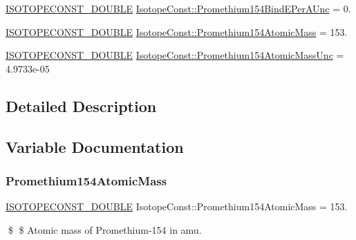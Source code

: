 \begin{DoxyCompactItemize}
\item 
\mbox{\hyperlink{group___isotope_const-_macros_ga8f45a7272ce02c0b4c65c44636ed719a}{I\+S\+O\+T\+O\+P\+E\+C\+O\+N\+S\+T\+\_\+\+D\+O\+U\+B\+LE}} \mbox{\hyperlink{group___isotope_const-_promethium-_pm154_ga8212d49362dad33b635c26261a298b07}{Isotope\+Const\+::\+Promethium154\+Bind\+E\+Per\+A\+Unc}} = 0.
\item 
\mbox{\hyperlink{group___isotope_const-_macros_ga8f45a7272ce02c0b4c65c44636ed719a}{I\+S\+O\+T\+O\+P\+E\+C\+O\+N\+S\+T\+\_\+\+D\+O\+U\+B\+LE}} \mbox{\hyperlink{group___isotope_const-_promethium-_pm154_ga36d40fe8c6eb67bcb65b55acade9707b}{Isotope\+Const\+::\+Promethium154\+Atomic\+Mass}} = 153.
\item 
\mbox{\hyperlink{group___isotope_const-_macros_ga8f45a7272ce02c0b4c65c44636ed719a}{I\+S\+O\+T\+O\+P\+E\+C\+O\+N\+S\+T\+\_\+\+D\+O\+U\+B\+LE}} \mbox{\hyperlink{group___isotope_const-_promethium-_pm154_ga985ca2131c74cf95a3def8c6c417a5a3}{Isotope\+Const\+::\+Promethium154\+Atomic\+Mass\+Unc}} = 4.\+9733e-\/05
\end{DoxyCompactItemize}


\subsection{Detailed Description}


\subsection{Variable Documentation}
\mbox{\label{group___isotope_const-_promethium-_pm154_ga36d40fe8c6eb67bcb65b55acade9707b}} 
\subsubsection{\texorpdfstring{Promethium154\+Atomic\+Mass}{Promethium154AtomicMass}}
{\footnotesize\ttfamily \mbox{\hyperlink{group___isotope_const-_macros_ga8f45a7272ce02c0b4c65c44636ed719a}{I\+S\+O\+T\+O\+P\+E\+C\+O\+N\+S\+T\+\_\+\+D\+O\+U\+B\+LE}} Isotope\+Const\+::\+Promethium154\+Atomic\+Mass = 153.}

\$ \$ Atomic mass of Promethium-\/154 in amu. \mbox{\label{group___isotope_const-_promethium-_pm154_ga985ca2131c74cf95a3def8c6c417a5a3}} 
